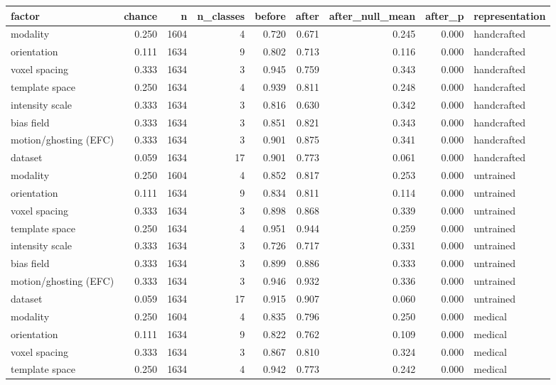 \begin{tabular}{lrrrrrrrl}
\toprule
factor & chance & n & n\_classes & before & after & after\_null\_mean & after\_p & representation \\
\midrule
modality & 0.250 & 1604 & 4 & 0.720 & 0.671 & 0.245 & 0.000 & handcrafted \\
orientation & 0.111 & 1634 & 9 & 0.802 & 0.713 & 0.116 & 0.000 & handcrafted \\
voxel spacing & 0.333 & 1634 & 3 & 0.945 & 0.759 & 0.343 & 0.000 & handcrafted \\
template space & 0.250 & 1634 & 4 & 0.939 & 0.811 & 0.248 & 0.000 & handcrafted \\
intensity scale & 0.333 & 1634 & 3 & 0.816 & 0.630 & 0.342 & 0.000 & handcrafted \\
bias field & 0.333 & 1634 & 3 & 0.851 & 0.821 & 0.343 & 0.000 & handcrafted \\
motion/ghosting (EFC) & 0.333 & 1634 & 3 & 0.901 & 0.875 & 0.341 & 0.000 & handcrafted \\
dataset & 0.059 & 1634 & 17 & 0.901 & 0.773 & 0.061 & 0.000 & handcrafted \\
modality & 0.250 & 1604 & 4 & 0.852 & 0.817 & 0.253 & 0.000 & untrained \\
orientation & 0.111 & 1634 & 9 & 0.834 & 0.811 & 0.114 & 0.000 & untrained \\
voxel spacing & 0.333 & 1634 & 3 & 0.898 & 0.868 & 0.339 & 0.000 & untrained \\
template space & 0.250 & 1634 & 4 & 0.951 & 0.944 & 0.259 & 0.000 & untrained \\
intensity scale & 0.333 & 1634 & 3 & 0.726 & 0.717 & 0.331 & 0.000 & untrained \\
bias field & 0.333 & 1634 & 3 & 0.899 & 0.886 & 0.333 & 0.000 & untrained \\
motion/ghosting (EFC) & 0.333 & 1634 & 3 & 0.946 & 0.932 & 0.336 & 0.000 & untrained \\
dataset & 0.059 & 1634 & 17 & 0.915 & 0.907 & 0.060 & 0.000 & untrained \\
modality & 0.250 & 1604 & 4 & 0.835 & 0.796 & 0.250 & 0.000 & medical \\
orientation & 0.111 & 1634 & 9 & 0.822 & 0.762 & 0.109 & 0.000 & medical \\
voxel spacing & 0.333 & 1634 & 3 & 0.867 & 0.810 & 0.324 & 0.000 & medical \\
template space & 0.250 & 1634 & 4 & 0.942 & 0.773 & 0.242 & 0.000 & medical \\

\end{tabular}
